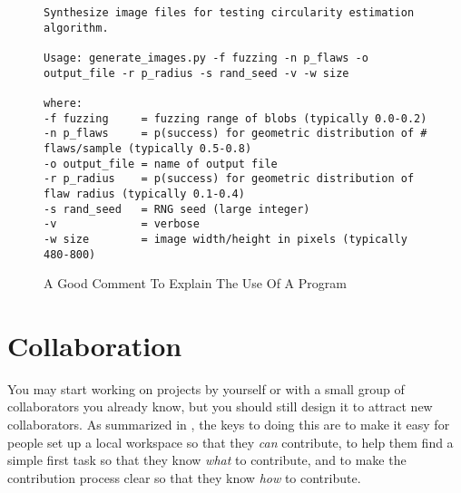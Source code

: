 \documentclass[10pt]{article}
\begin{document}
\begin{figure}
\begin{verbatim}
Synthesize image files for testing circularity estimation algorithm.

Usage: generate_images.py -f fuzzing -n p_flaws -o output_file -r p_radius -s rand_seed -v -w size

where:
-f fuzzing     = fuzzing range of blobs (typically 0.0-0.2)
-n p_flaws     = p(success) for geometric distribution of # flaws/sample (typically 0.5-0.8)
-o output_file = name of output file
-r p_radius    = p(success) for geometric distribution of flaw radius (typically 0.1-0.4)
-s rand_seed   = RNG seed (large integer)
-v             = verbose
-w size        = image width/height in pixels (typically 480-800)
\end{verbatim}
\caption{A Good Comment To Explain The Use Of A Program}
\label{fig:comment}
\end{figure}

\section{Collaboration}\label{sec:collaboration}

You may start working on projects by yourself or with a small group of
collaborators you already know, but you should still design it to
attract new collaborators.  As summarized in \cite{steinmacher2015},
the keys to doing this are to make it easy for people set up a local
workspace so that they \emph{can} contribute, to help them find a
simple first task so that they know \emph{what} to contribute, and to
make the contribution process clear so that they know \emph{how} to
contribute.
\end{document}
